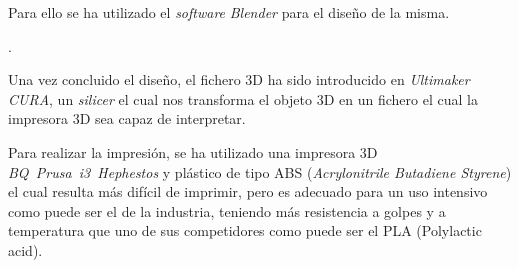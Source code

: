 Para ello se ha utilizado el \emph{software} \emph{Blender} para el diseño de la misma.

.

Una vez concluido el diseño, el fichero 3D ha sido introducido en \emph{Ultimaker CURA}, un \emph{silicer} el cual nos transforma el objeto 3D en un fichero el cual la impresora 3D sea capaz de interpretar.

Para realizar la impresión, se ha utilizado una impresora 3D \emph{BQ~Prusa~i3~Hephestos} y plástico de tipo ABS (\emph{Acrylonitrile Butadiene Styrene}) el cual resulta más difícil de imprimir, pero es adecuado para un uso intensivo como puede ser el de la industria, teniendo más resistencia a golpes y a temperatura que uno de sus competidores como puede ser el PLA (Polylactic acid).

